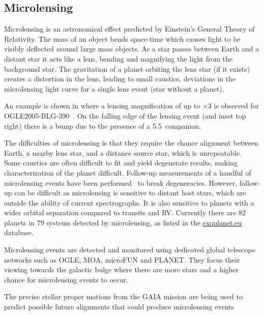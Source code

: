 \subsection{Microlensing}
\label{sub:microlensing}
Microlensing is an astronomical effect predicted by Einstein's General Theory of Relativity.
The mass of an object bends space-time which causes light to be visibly deflected around large mass objects.
As a star passes between Earth and a distant star it acts like a lens, bending and magnifying the light from the background star.
The gravitation of a planet orbiting the lens star (if it exists) creates a distortion in the lens, leading to small caustics, deviations in the microlensing light curve for a single lens event (star without a planet).

An example is shown in  where a lensing magnification of up to $\times3$ is observed for {OGLE2005-BLG-390}~\citep{beaulieu_discovery_2006}.
On the falling edge of the lensing event (and inset top right) there is a bump due to the presence of a 5.5\,\Mjup{} companion.

The difficulties of microlensing is that they require the chance alignment between Earth, a nearby lens star, and a distance source star, which is unrepeatable.
Some caustics are often difficult to fit and yield degenerate results, making characterization of the planet difficult.
Follow-up measurements of a handful of microlensing events have been performed~\citep[e.g.][]{kubas_frozen_2012, batista_confirmation_2015, santerne_spectroscopic_2016} to break degeneracies.
However, follow-up can be difficult as microlensing is sensitive to distant host stars, which are outside the ability of current spectrographs.
It is also sensitive to planets with a wider orbital separation compared to transits and {RV}.
Currently there are 82 planets in 79 systems detected by microlensing, as listed in the \href{https:\\www.exoplanet.eu}{exoplanet.eu} database.

Microlensing events are detected and monitored using dedicated global telescope networks such as {OGLE}, {MOA}, {microFUN} and {PLANET}.
They focus their viewing towards the galactic bulge where there are more stars and a higher chance for microlensing events to occur.

The precise stellar proper motions from the GAIA mission are being used to predict possible future alignments that could produce microlensing events~\citep{kluter_prediction_2018}

